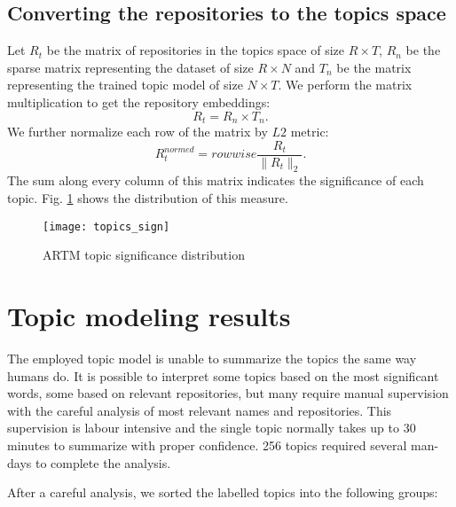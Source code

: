 \documentclass[conference,10pt]{IEEEtran}
\begin{document}
\subsection{Converting the repositories to the topics space}
Let $R_t$ be the matrix of repositories in the topics space of size $R\times T$, $R_n$ be the sparse matrix representing the dataset of size $R\times N$ and $T_n$ be the matrix representing the trained topic model of size $N\times T$. We perform the matrix multiplication to get the repository embeddings:
\begin{equation}
R_t = R_n \times T_n.
\end{equation}
We further normalize each row of the matrix by $L2$ metric:
\begin{equation}
R_t^{normed} = rowwise\frac{R_t}{\lVert R_t\rVert_2}.
\end{equation}
The sum along every column of this matrix indicates the significance of each topic. Fig. \ref{topics_sign} shows the distribution of this measure.

\begin{figure}
\caption{ARTM topic significance distribution}
\label{topics_sign}
\begin{center}
\texttt{[image: topics\_sign]}
\end{center}
\end{figure}

\section{Topic modeling results} \label{results}
The employed topic model is unable to summarize the topics the same way humans do. It is possible to interpret some topics based on the most significant words, some based on relevant repositories, but many require manual supervision with the careful analysis of most relevant names and repositories. This supervision is labour intensive and the single topic normally takes up to 30 minutes to summarize with proper confidence. 256 topics required several man-days to complete the analysis.

After a careful analysis, we sorted the labelled topics into the following groups:
\end{document}
